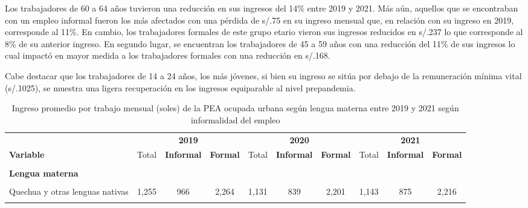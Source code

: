 \documentclass[
  letterpaper,
  12pt,
  oneside,
  spanish,
  doublespacing,
  headsepline,
  parskip]{MastersDoctoralThesis}
\begin{document}
Los trabajadores de 60 a 64 años tuvieron una reducción en sus ingresos
del 14\% entre 2019 y 2021. Más aún, aquellos que se encontraban con un
empleo informal fueron los más afectados con una pérdida de s/.75 en su
ingreso mensual que, en relación con su ingreso en 2019, corresponde al
11\%. En cambio, los trabajadores formales de este grupo etario vieron
sus ingresos reducidos en s/.237 lo que corresponde al 8\% de su
anterior ingreso. En segundo lugar, se encuentran los trabajadores de 45
a 59 años con una reducción del 11\% de sus ingresos lo cual impactó en
mayor medida a los trabajadores formales con una reducción en s/.168.

Cabe destacar que los trabajadores de 14 a 24 años, los más jóvenes, si
bien su ingreso se sitúa por debajo de la remuneración mínima vital
(s/.1025), se muestra una ligera recuperación en los ingresos
equiparable al nivel prepandemia.

\hypertarget{tbl-ing_leng}{}
\begin{table}[H]
\caption{\label{tbl-ing_leng}Ingreso promedio por trabajo mensual (soles) de la PEA ocupada urbana
según lengua materna entre 2019 y 2021 según informalidad del empleo }\tabularnewline

\centering\begingroup\fontsize{9}{11}\selectfont

\begin{tabular}{>{\raggedright\arraybackslash}p{10em}ccccccccc}
\toprule
\multicolumn{1}{c}{ } & \multicolumn{3}{c}{\textbf{2019}} & \multicolumn{3}{c}{\textbf{2020}} & \multicolumn{3}{c}{\textbf{2021}} \\
\cmidrule(l{3pt}r{3pt}){2-4} \cmidrule(l{3pt}r{3pt}){5-7} \cmidrule(l{3pt}r{3pt}){8-10}
\textbf{Variable} & Total & \textbf{Informal} & \textbf{Formal} & Total & \textbf{Informal} & \textbf{Formal} & Total & \textbf{Informal} & \textbf{Formal}\\
\midrule
\cellcolor{gray!6}{\textbf{Nacional}} & \cellcolor{gray!6}{1,595} & \cellcolor{gray!6}{1,037} & \cellcolor{gray!6}{2,599} & \cellcolor{gray!6}{1,407} & \cellcolor{gray!6}{901} & \cellcolor{gray!6}{2,380} & \cellcolor{gray!6}{1,443} & \cellcolor{gray!6}{989} & \cellcolor{gray!6}{2,473}\\
\textbf{Lengua materna} &  &  &  &  &  &  &  &  & \\
\cellcolor{gray!6}{Castellano} & \cellcolor{gray!6}{1,645} & \cellcolor{gray!6}{1,050} & \cellcolor{gray!6}{2,627} & \cellcolor{gray!6}{1,453} & \cellcolor{gray!6}{911} & \cellcolor{gray!6}{2,398} & \cellcolor{gray!6}{1,493} & \cellcolor{gray!6}{1,011} & \cellcolor{gray!6}{2,496}\\
Quechua y otras lenguas nativas & 1,255 & 966 & 2,264 & 1,131 & 839 & 2,201 & 1,143 & 875 & 2,216\\
\cellcolor{gray!6}{Otros} & \cellcolor{gray!6}{2,050} & \cellcolor{gray!6}{1,410} & \cellcolor{gray!6}{2,918} & \cellcolor{gray!6}{1,610} & \cellcolor{gray!6}{1,399} & \cellcolor{gray!6}{2,416} & \cellcolor{gray!6}{1,657} & \cellcolor{gray!6}{970} & \cellcolor{gray!6}{3,062}\\
\bottomrule
\end{tabular}
\endgroup{}
\end{table}
\end{document}
